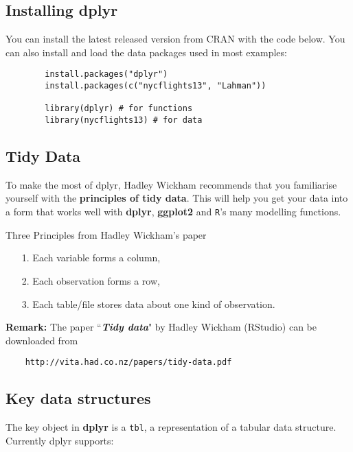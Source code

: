 	\subsection{Installing dplyr}
	You can install the latest released version from CRAN with the code below.
	You can also install and load the data packages used in most examples: 
	\begin{framed}
		\begin{verbatim}
		install.packages("dplyr")
		install.packages(c("nycflights13", "Lahman"))
		
		library(dplyr) # for functions
		library(nycflights13) # for data
		\end{verbatim}
	\end{framed}
	
	\subsection{Tidy Data}
	To make the most of dplyr, Hadley Wickham recommends that you familiarise yourself with the \textbf{principles of tidy data}. This will help you get your data into a form that works well with \textbf{dplyr}, \textbf{ggplot2} and \texttt{R}'s many modelling functions.\\
	\bigskip
	
	\begin{framed}
		\noindent Three Principles from Hadley Wickham's paper
		\begin{itemize}
			\item[1.] Each variable forms a column, 
			\item[2.] Each observation forms a row, 
			\item[3.] Each table/file stores data about one kind of observation.
		\end{itemize}
	\end{framed}
	\noindent \textbf{Remark:}  The paper ``\textit{\textbf{Tidy data}}" by Hadley Wickham (RStudio) can be downloaded from 
	\begin{verbatim}
	http://vita.had.co.nz/papers/tidy-data.pdf
	\end{verbatim}
	
	
	\subsection{Key data structures}
	
	The key object in \textbf{dplyr} is a \texttt{tbl}, a representation of a tabular data structure. Currently dplyr supports:
	
